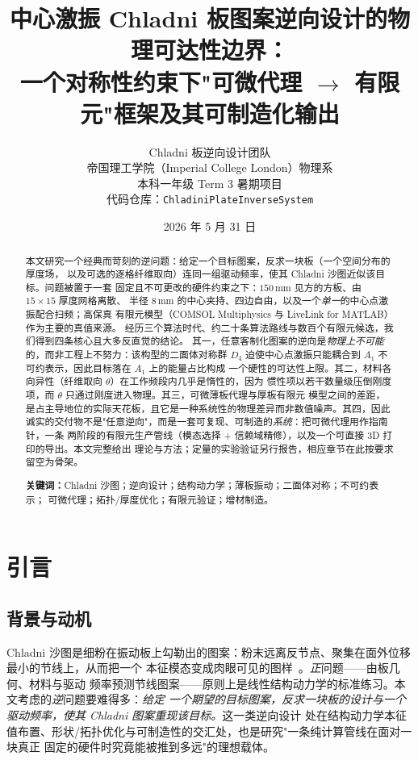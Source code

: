 \documentclass[11pt,a4paper]{article}
\title{\bfseries 中心激振 Chladni 板图案逆向设计的物理可达性边界：\\[2pt]
\large 一个对称性约束下"可微代理 $\to$ 有限元"框架及其可制造化输出}
\author{%
Chladni 板逆向设计团队\\
\small 帝国理工学院（Imperial College London）物理系\\
\small 本科一年级 {\textperiodcentered} Term 3 暑期项目\\
\small 代码仓库：\texttt{ChladiniPlateInverseSystem}}
\date{2026 年 5 月 31 日}
\newcommand{\Aone}{A_1}
\newcommand{\Dfour}{D_4}
\begin{document}
\maketitle

\begin{abstract}
\noindent
本文研究一个经典而苛刻的逆问题：给定一个目标图案，反求一块板（一个空间分布的厚度场，
以及可选的逐格纤维取向）连同一组驱动频率，使其 Chladni 沙图近似该目标。问题被置于一套
固定且不可更改的硬件约束之下：$150\,\text{mm}$ 见方的方板、由 $15\times15$ 厚度网格离散、
半径 $8\,\text{mm}$ 的中心夹持、四边自由，以及一个\emph{单一}的中心点激振配合扫频；高保真
有限元模型（COMSOL Multiphysics 与 LiveLink\texttrademark{} for MATLAB）作为主要的真值来源。
经历三个算法时代、约二十条算法路线与数百个有限元候选，我们得到四条核心且大多反直觉的结论。
其一，任意客制化图案的逆向是\emph{物理上不可能}的，而非工程上不努力：该构型的二面体对称群
$\Dfour$ 迫使中心点激振只能耦合到 $\Aone$ 不可约表示，因此目标落在 $\Aone$ 上的能量占比构成
一个硬性的可达性上限。其二，材料各向异性（纤维取向 $\theta$）在工作频段内几乎是惰性的，因为
惯性项以若干数量级压倒刚度项，而 $\theta$ 只通过刚度进入物理。其三，可微薄板代理与厚板有限元
模型之间的差距，是占主导地位的实际天花板，且它是一种系统性的物理差异而非数值噪声。其四，因此
诚实的交付物不是"任意逆向"，而是一套可复现、可制造的\emph{系统}：把可微代理用作指南针，一条
两阶段的有限元生产管线（模态选择 + 信赖域精修），以及一个可直接 3D 打印的导出。本文完整给出
理论与方法；定量的实验验证另行报告，相应章节在此按要求留空为骨架。

\medskip
\noindent\textbf{关键词：}Chladni 沙图；逆向设计；结构动力学；薄板振动；二面体对称；不可约表示；
可微代理；拓扑/厚度优化；有限元验证；增材制造。
\end{abstract}

\section{引言}

\subsection{背景与动机}
Chladni 沙图是细粉在振动板上勾勒出的图案：粉末远离反节点、聚集在面外位移最小的节线上，从而把一个
本征模态变成肉眼可见的图样~\cite{chladni1787,waller1939}。\emph{正}问题------由板几何、材料与驱动
频率预测节线图案------原则上是线性结构动力学的标准练习。本文考虑的\emph{逆}问题要难得多：\emph{给定
一个期望的目标图案，反求一块板的设计与一个驱动频率，使其 Chladni 图案重现该目标。}这一类逆向设计
处在结构动力学本征值布置、形状/拓扑优化与可制造性的交汇处，也是研究"一条纯计算管线在面对一块真正
固定的硬件时究竟能被推到多远"的理想载体。
\end{document}
